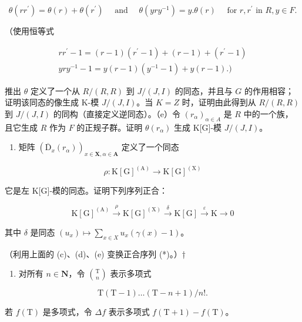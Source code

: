 \[
\theta (r r ^ {\prime}) = \theta (r) + \theta (r ^ {\prime}) \quad \text { and } \quad \theta (y r y ^ {- 1}) = y. \theta (r) \quad \text { for   } r, r ^ {\prime} \text {   in   } R, y \in F.
\]

（使用恒等式

\[
\begin{array}{c} {r r ^ {\prime} - 1 = (r - 1) (r ^ {\prime} - 1) + (r - 1) + (r ^ {\prime} - 1)} \\ {y r y ^ {- 1} - 1 = y (r - 1) (y ^ {- 1} - 1) + y (r - 1).)} \end{array}
\]

推出 \(\theta\) 定义了一个从 \(R/(R, R)\) 到 \(J/(J, I)\) 的同态，并且与 \(G\) 的作用相容；证明该同态的像生成 K-模 \(J/(J, I)\)。当 \(K = Z\) 时，证明由此得到从 \(R/(R, R)\) 到 \(J/(J, I)\) 的同构（直接定义逆同态）。（e）令 \((r_{\alpha})_{\alpha \in A}\) 是 \(R\) 中的一个族，且它生成 \(R\) 作为 \(F\) 的正规子群。证明 \(\theta(r_{\alpha})\) 生成 K{[}G{]}-模 \(J/(J, I)\)。

\begin{enumerate}
\def\labelenumi{(\alph{enumi})}
\setcounter{enumi}{5}
\tightlist
\item
  矩阵 \((\overline{\mathrm{D}}_x(r_\alpha))_{x\in \mathbf{X},\alpha \in \mathbf{A}}\) 定义了一个同态
\end{enumerate}

\[
\rho \colon \mathrm{K} [ \mathrm{G} ] ^ {(\mathrm{A})} \rightarrow \mathrm{K} [ \mathrm{G} ] ^ {(\mathrm{X})}
\]

它是左 K{[}G{]}-模的同态。证明下列序列正合：

\[
\mathrm{K} [ \mathrm{G} ] ^ {(\mathrm{A})} \xrightarrow {\rho} \mathrm{K} [ \mathrm{G} ] ^ {(\mathrm{X})} \xrightarrow {\delta} \mathrm{K} [ \mathrm{G} ] \xrightarrow {\varepsilon} \mathrm{K} \longrightarrow 0\tag{**}
\]

其中 \(\delta\) 是同态 \((u_x) \mapsto \sum_{x \in X} u_x(\gamma(x) - 1)\)。

（利用上面的 (c)、(d)、(e) 变换正合序列 (*)。）†

\begin{enumerate}
\def\labelenumi{\arabic{enumi}.}
\setcounter{enumi}{3}
\tightlist
\item
  对所有 \(n \in \mathbf{N}\)，令 \(\binom{\mathrm{T}}{n}\) 表示多项式
\end{enumerate}

\[
\mathrm{T} (\mathrm{T} - 1) \dots (\mathrm{T} - n + 1) / n!.
\]

若 \(f(\mathrm{T})\) 是多项式，令 \(\Delta f\) 表示多项式 \(f(\mathrm{T} + 1) - f(\mathrm{T})\)。

